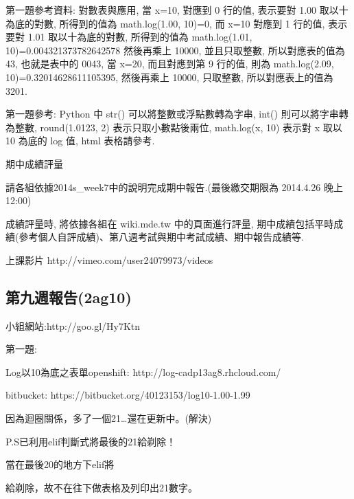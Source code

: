 \documentclass[]{article}
\begin{document}
第一題參考資料: 對數表與應用, 當 x=10, 對應到 0 行的值, 表示要對 1.00
取以十為底的對數, 所得到的值為 math.log(1.00, 10)=0, 而 x=10 對應到 1
行的值, 表示要對 1.01 取以十為底的對數, 所得到的值為 math.log(1.01,
10)=0.004321373782642578 然後再乘上 10000, 並且只取整數,
所以對應表的值為 43, 也就是表中的 0043, 當 x=20, 而且對應到第 9 行的值,
則為 math.log(2.09, 10)=0.32014628611105395, 然後再乘上 10000, 只取整數,
所以對應表上的值為 3201.

第一題參考: Python 中 str() 可以將整數或浮點數轉為字串, int()
則可以將字串轉為整數, round(1.0123, 2) 表示只取小數點後兩位, math.log(x,
10) 表示對 x 取以 10 為底的 log 值, html 表格請參考.

期中成績評量

請各組依據2014s\_week7中的說明完成期中報告.(最後繳交期限為 2014.4.26
晚上 12:00)

成績評量時, 將依據各組在 wiki.mde.tw 中的頁面進行評量,
期中成績包括平時成績(參考個人自評成績)、第八週考試與期中考試成績、期中報告成績等.

上課影片 http://vimeo.com/user24079973/videos

\subsection{第九週報告(2ag10)}\label{ux7b2cux4e5dux9031ux5831ux544a2ag10}

小組網站:http://goo.gl/Hy7Ktn

第一題:

Log以10為底之表單openshift: http://log-cadp13ag8.rhcloud.com/

bitbucket: https://bitbucket.org/40123153/log10-1.00-1.99

因為迴圈關係，多了一個21\ldots{}還在更新中。(解決)

P.S已利用elif判斷式將最後的21給剃除！

當在最後20的地方下elif將

給剃除，故不在往下做表格及列印出21數字。
\end{document}
